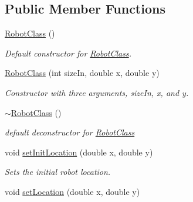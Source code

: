 \subsection*{Public Member Functions}
\begin{DoxyCompactItemize}
\item 
\hyperlink{classRobotClass_a7125604039c2a4b39e34e4354bd4ce19}{Robot\-Class} ()
\begin{DoxyCompactList}\small\item\em Default constructor for \hyperlink{classRobotClass}{Robot\-Class}. \end{DoxyCompactList}\item 
\hyperlink{classRobotClass_a5fc34d4751e7af1868eefec70ecbe241}{Robot\-Class} (int size\-In, double x, double y)
\begin{DoxyCompactList}\small\item\em Constructor with three arguments, size\-In, x, and y. \end{DoxyCompactList}\item 
\hypertarget{classRobotClass_a7d7725737f146f85ed7ceeae7f300e9e}{\hyperlink{classRobotClass_a7d7725737f146f85ed7ceeae7f300e9e}{$\sim$\-Robot\-Class} ()}\label{classRobotClass_a7d7725737f146f85ed7ceeae7f300e9e}

\begin{DoxyCompactList}\small\item\em default deconstructor for \hyperlink{classRobotClass}{Robot\-Class} \end{DoxyCompactList}\item 
void \hyperlink{classRobotClass_a6e4902a26041b33ed83932a4514bb8c0}{set\-Init\-Location} (double x, double y)
\begin{DoxyCompactList}\small\item\em Sets the initial robot location. \end{DoxyCompactList}\item 
\hypertarget{classRobotClass_a264d12c67f65e3eef63a0e90a3b902b1}{void \hyperlink{classRobotClass_a264d12c67f65e3eef63a0e90a3b902b1}{set\-Location} (double x, double y)}\label{classRobotClass_a264d12c67f65e3eef63a0e90a3b902b1}


\end{DoxyCompactItemize}
